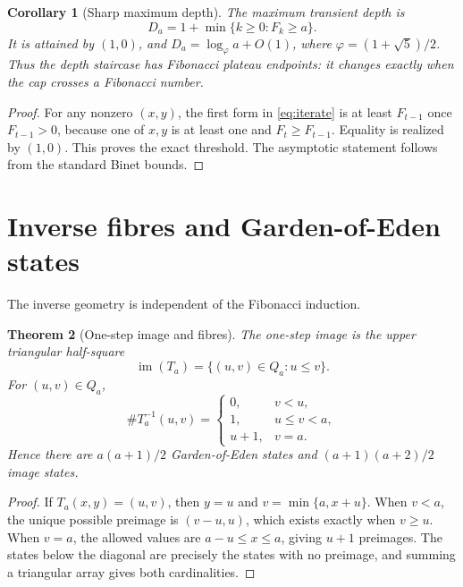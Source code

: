 \documentclass[11pt,a4paper]{amsart}
\newcommand{\im}{\operatorname{im}}
\newtheorem{theorem}{Theorem}[section]
\newtheorem{corollary}[theorem]{Corollary}
\begin{document}
\begin{corollary}[Sharp maximum depth]
\label{cor:maxdepth}
The maximum transient depth is
\begin{equation}
 \label{eq:maxdepth}
 D_a=1+\min\{k\geq0:F_k\geq a\}.
\end{equation}
It is attained by $(1,0)$, and $D_a=\log_{\varphi}a+O(1)$, where
$\varphi=(1+\sqrt5)/2$.  Thus the depth staircase has Fibonacci plateau
endpoints: it changes exactly when the cap crosses a Fibonacci number.
\end{corollary}

\begin{proof}
For any nonzero $(x,y)$, the first form in \eqref{eq:iterate} is at least
$F_{t-1}$ once $F_{t-1}>0$, because one of $x,y$ is at least one and
$F_t\geq F_{t-1}$.  Equality is realized by $(1,0)$.  This proves the exact
threshold.  The asymptotic statement follows from the standard Binet bounds.
\end{proof}

\section{Inverse fibres and Garden-of-Eden states}

The inverse geometry is independent of the Fibonacci induction.

\begin{theorem}[One-step image and fibres]
\label{thm:fibres}
The one-step image is the upper triangular half-square
\begin{equation}
 \label{eq:image}
 \im(T_a)=\{(u,v)\in Q_a:u\leq v\}.
\end{equation}
For $(u,v)\in Q_a$,
\begin{equation}
 \label{eq:fibres}
 \#T_a^{-1}(u,v)=
 \begin{cases}
  0,&v<u,\\
  1,&u\leq v<a,\\
  u+1,&v=a.
 \end{cases}
\end{equation}
Hence there are $a(a+1)/2$ Garden-of-Eden states and
$(a+1)(a+2)/2$ image states.
\end{theorem}

\begin{proof}
If $T_a(x,y)=(u,v)$, then $y=u$ and
$v=\min\{a,x+u\}$.  When $v<a$, the unique possible preimage is
$(v-u,u)$, which exists exactly when $v\geq u$.  When $v=a$, the allowed
values are $a-u\leq x\leq a$, giving $u+1$ preimages.  The states below the
diagonal are precisely the states with no preimage, and summing a triangular
array gives both cardinalities.
\end{proof}
\end{document}
